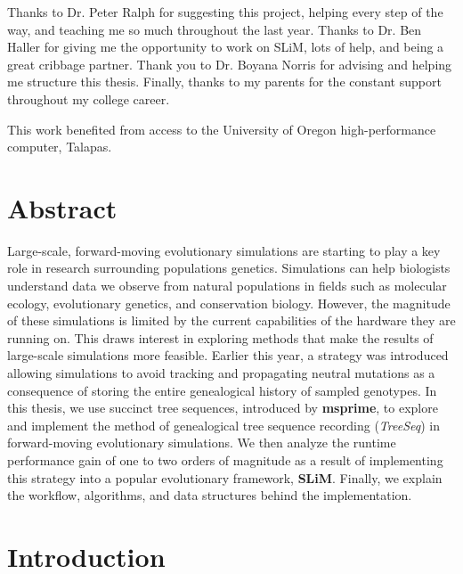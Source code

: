 \documentclass{article}
\begin{document}
Thanks to Dr. Peter Ralph for suggesting this project, helping every step of the way, and teaching me so much throughout the last year. 
Thanks to Dr. Ben Haller for giving me the opportunity to work on SLiM, lots of help, and being a great cribbage partner.
Thank you to Dr. Boyana Norris for advising and helping me structure this thesis.
Finally, thanks to my parents for the constant support throughout my college career.

This work benefited from access to the University of Oregon high-performance computer, Talapas.

\newpage

\tableofcontents
\newpage
 \setcounter{page}{1}
\setcounter{section}{0}



\section{Abstract}

Large-scale, forward-moving evolutionary simulations are starting to play a key role in research surrounding populations genetics. 
Simulations can help biologists understand data we observe from natural populations  
in fields such as molecular ecology, evolutionary genetics, and conservation biology.
However, the magnitude of these simulations is limited by the current capabilities of the hardware they are running on. 
This draws interest in exploring methods that make the results of large-scale simulations more feasible. 
Earlier this year, a strategy was introduced allowing simulations to avoid tracking and propagating neutral 
mutations as a consequence of storing the entire genealogical history of sampled genotypes.
In this thesis, we use succinct tree sequences, introduced by \textbf{msprime}, to
explore and implement the method of genealogical tree sequence recording (\textit{TreeSeq})
in forward-moving evolutionary simulations.
We then analyze the runtime performance gain of one to two orders of magnitude as a result of 
implementing this strategy into a popular evolutionary framework, \textbf{SLiM}.
Finally, we explain the workflow, algorithms, and data structures 
behind the implementation.

\section{Introduction}
\end{document}
